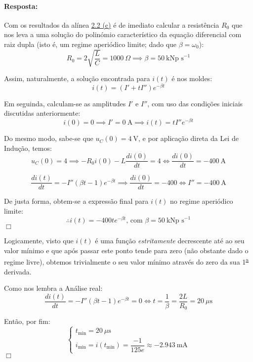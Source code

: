 \paragraph{Resposta:}
Com os resultados da alínea \hyperref[subsubsec_c2]{\underline{2.2} (c)} é de imediato calcular a resistência $R_0$ que nos leva a uma solução do polinómio característico da equação diferencial com raiz dupla (isto é, um regime aperiódico limite; dado que $\beta = \omega_0$):
$$
    R_0 = 2\sqrt{\frac{L}{C}} = 1000\ \Omega \implies \beta = 50\ \text{kNp s}^{-1}
$$

Assim, naturalmente, a solução encontrada para $i(t)$ é nos moldes:
\begin{equation}
    i(t) = (I' + t I'')e^{-\beta t}    
\end{equation}

Em seguinda, calculam-se as amplitudes $I'$ e $I''$, com uso das condições iniciais discutidas anteriormente:
$$
    i(0) = 0 \implies I' = 0\ \text{A} \implies i(t) = t I'' e^{-\beta t} 
$$

Do mesmo modo, sabe-se que $u_C(0) = 4\ \text{V}$, e por aplicação direta da Lei de Indução, temos:
$$
    u_C(0) = 4 \implies -R_0 i(0) - L \frac{di(0)}{dt} = 4 \iff \frac{di(0)}{dt} = -400\ \text{A}
$$

$$
    \frac{di(t)}{dt} = -I''(\beta t - 1)e^{-\beta t} \implies \frac{di(0)}{dt} = -400 \iff I'' = -400\ \text{A}
$$

De justa forma, obtem-se a expressão final para $i(t)$ no regime aperiódico limite:
$$
    \therefore i(t) = -400t e^{-\beta t}\text{, com }\beta = 50\ \text{kNp s}^{-1}
$$
\hfill \ensuremath{\Box}

Logicamente, visto que $i(t)$ é uma função \textit{estritamente} decrescente até ao seu valor mínimo e que após passar este ponto tende para zero (não obstante dado o regime livre), obtemos trivialmente o seu valor mínimo através do zero da sua 1\textsuperscript{\underline{a}} derivada.

Como nos lembra a Análise real:
$$
    \frac{di(t)}{dt} = -I''(\beta t - 1)e^{-\beta t} = 0 \iff t = \frac{1}{\beta} = \frac{2L}{R_0} = 20\ \mu\text{s}
$$

Então, por fim:
$$
    \begin{cases}
        t_{\text{min}} = 20\ \mu\text{s}\\
        i_{\text{min}} = i(t_{\text{min}}) = \dfrac{-1}{125e} \approx -2.943\ \text{mA}
    \end{cases}
$$
\hfill \ensuremath{\Box}
